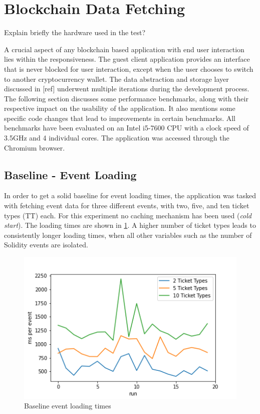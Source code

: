 \section{Blockchain Data Fetching}\label{section:data-model}

Explain briefly the hardware used in the test?

A crucial aspect of any blockchain based application with end user interaction lies within the responsiveness. The guest client application provides an interface that is never blocked for user interaction, except when the user chooses to switch to another cryptocurrency wallet. The data abstraction and storage layer discussed in [ref] underwent multiple iterations during the development process. The following section discusses some performance benchmarks, along with their respective impact on the usability of the application. It also mentions some specific code changes that lead to improvements in certain benchmarks. All benchmarks have been evaluated on an Intel i5-7600 CPU with a clock speed of 3.5GHz and 4 individual cores. The application was accessed through the Chromium browser.

\subsection{Baseline - Event Loading}\label{section:bl-events}
In order to get a solid baseline for event loading times, the application was tasked with fetching event data for three different events, with two, five, and ten ticket types (TT) each. For this experiment no caching mechanism has been used (\textit{cold start}). The loading times are shown in \ref{img:baseline1}. A higher number of ticket types leads to consistently longer loading times, when all other variables such as the number of Solidity events are isolated.

\begin{figure}[H]
    \centering
    \includegraphics[width=14cm]{images/plot1.png}
    \caption{Baseline event loading times \protect\footnotemark}
    \label{img:baseline1}
\end{figure}


